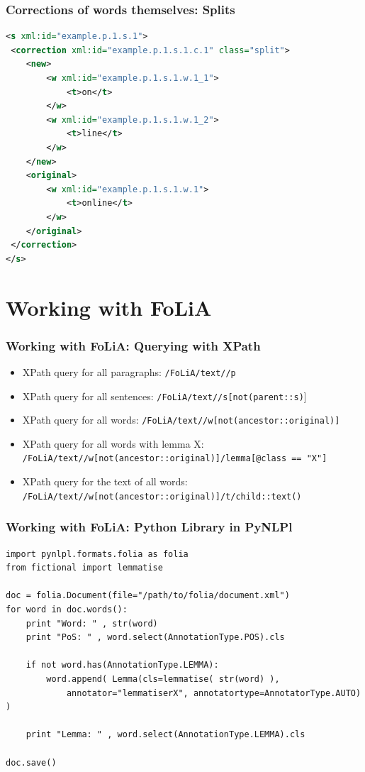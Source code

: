 \documentclass[compress]{beamer}
\begin{document}
\begin{frame}[fragile]
\frametitle{Corrections of words themselves: Splits}

\begin{lstlisting}[language=xml]
<s xml:id="example.p.1.s.1">
 <correction xml:id="example.p.1.s.1.c.1" class="split">
    <new>    
        <w xml:id="example.p.1.s.1.w.1_1">
            <t>on</t>
        </w>
        <w xml:id="example.p.1.s.1.w.1_2">
            <t>line</t>
        </w>                        
    </new>
    <original>
        <w xml:id="example.p.1.s.1.w.1">
            <t>online</t>
        </w>
    </original>
 </correction>               
</s>
\end{lstlisting} 

\end{frame}

\section{Working with FoLiA}

\begin{frame}
\frametitle{Working with FoLiA: Querying with XPath}

    \begin{itemize}
    \item XPath query for all paragraphs: \texttt{/FoLiA/text//p}
    \item XPath query for all sentences: \texttt{/FoLiA/text//s[not(parent::s)}] 
    \item XPath query for all words: \texttt{/FoLiA/text//w[not(ancestor::original)]}
    \item XPath query for all words with lemma X: \\ \texttt{/FoLiA/text//w[not(ancestor::original)]/lemma[@class == "X"]}
    \item XPath query for the text of all words: \\ \texttt{/FoLiA/text//w[not(ancestor::original)]/t/child::text()}
    \end{itemize}

\end{frame}

\begin{frame}[fragile]
\frametitle{Working with FoLiA: Python Library in PyNLPl}

{
\footnotesize
\begin{verbatim}
import pynlpl.formats.folia as folia
from fictional import lemmatise

doc = folia.Document(file="/path/to/folia/document.xml")
for word in doc.words():
    print "Word: " , str(word)
    print "PoS: " , word.select(AnnotationType.POS).cls
    
    if not word.has(AnnotationType.LEMMA):
        word.append( Lemma(cls=lemmatise( str(word) ), 
            annotator="lemmatiserX", annotatortype=AnnotatorType.AUTO) )    

    print "Lemma: " , word.select(AnnotationType.LEMMA).cls   
                 
doc.save()    
\end{verbatim} 
}

\end{frame}
\end{document}
